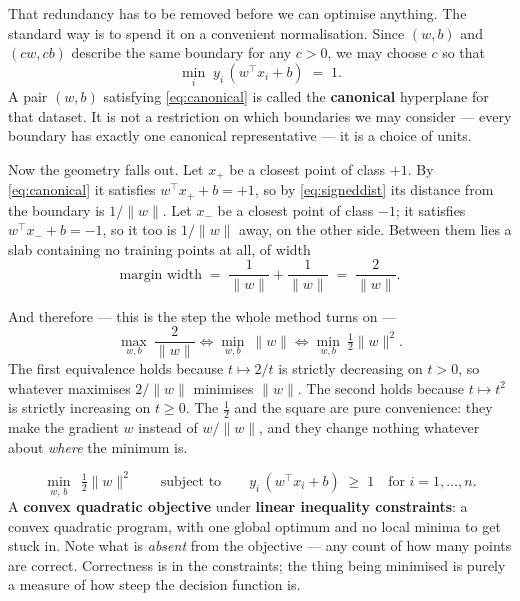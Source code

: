 \documentclass[11pt]{article}
\begin{document}
That redundancy has to be removed before we can optimise anything. The
standard way is to spend it on a convenient normalisation. Since $(w,b)$ and
$(cw, cb)$ describe the same boundary for any $c > 0$, we may choose $c$ so
that
\begin{equation}
  \min_i\; y_i\,(w^\top x_i + b) \;=\; 1 .
  \label{eq:canonical}
\end{equation}
A pair $(w,b)$ satisfying \eqref{eq:canonical} is called the \textbf{canonical}
hyperplane for that dataset. It is not a restriction on which boundaries we may
consider --- every boundary has exactly one canonical representative --- it is
a choice of units.

Now the geometry falls out. Let $x_+$ be a closest point of class $+1$. By
\eqref{eq:canonical} it satisfies $w^\top x_+ + b = +1$, so by
\eqref{eq:signeddist} its distance from the boundary is $1/\|w\|$. Let $x_-$ be
a closest point of class $-1$; it satisfies $w^\top x_- + b = -1$, so it too is
$1/\|w\|$ away, on the other side. Between them lies a slab containing no
training points at all, of width
\begin{equation}
  \text{margin width} \;=\; \frac{1}{\|w\|} + \frac{1}{\|w\|}
  \;=\; \frac{2}{\|w\|} .
  \label{eq:width}
\end{equation}

And therefore --- this is the step the whole method turns on ---
\begin{equation}
  \max_{w,b}\ \frac{2}{\|w\|}
  \iff \min_{w,b}\ \|w\|
  \iff \min_{w,b}\ \tfrac12 \|w\|^2 .
  \label{eq:equiv}
\end{equation}
The first equivalence holds because $t \mapsto 2/t$ is strictly decreasing on
$t > 0$, so whatever maximises $2/\|w\|$ minimises $\|w\|$. The second holds
because $t \mapsto t^2$ is strictly increasing on $t \ge 0$. The $\tfrac12$
and the square are pure convenience: they make the gradient $w$ instead of
$w/\|w\|$, and they change nothing whatever about \emph{where} the minimum is.

\begin{keyidea}
\[
  \min_{w,\,b}\ \ \tfrac12\|w\|^2
  \qquad\text{subject to}\qquad
  y_i\,(w^\top x_i + b) \;\ge\; 1
  \quad\text{for } i = 1,\dots,n .
\]
A \textbf{convex quadratic objective} under \textbf{linear inequality
constraints}: a convex quadratic program, with one global optimum and no local
minima to get stuck in. Note what is \emph{absent} from the objective --- any
count of how many points are correct. Correctness is in the constraints; the
thing being minimised is purely a measure of how steep the decision function
is.
\end{keyidea}
\end{document}
